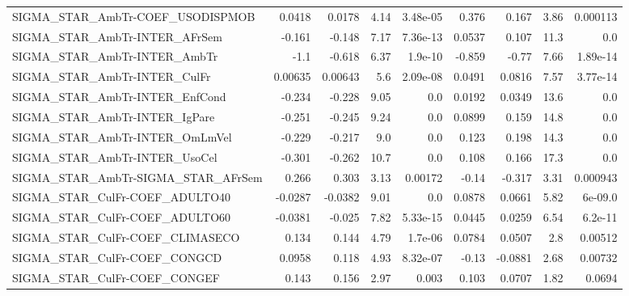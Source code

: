 \begin{tabular}{lrrrrrrrr}
SIGMA\_STAR\_AmbTr-COEF\_USODISPMOB      &      0.0418 &       0.0178 &     4.14 & 3.48e-05 &      0.376 &       0.167 &         3.86 &      0.000113 \\
SIGMA\_STAR\_AmbTr-INTER\_AFrSem         &      -0.161 &       -0.148 &     7.17 & 7.36e-13 &     0.0537 &       0.107 &         11.3 &           0.0 \\
SIGMA\_STAR\_AmbTr-INTER\_AmbTr          &        -1.1 &       -0.618 &     6.37 &  1.9e-10 &     -0.859 &       -0.77 &         7.66 &      1.89e-14 \\
SIGMA\_STAR\_AmbTr-INTER\_CulFr          &     0.00635 &      0.00643 &      5.6 & 2.09e-08 &     0.0491 &      0.0816 &         7.57 &      3.77e-14 \\
SIGMA\_STAR\_AmbTr-INTER\_EnfCond        &      -0.234 &       -0.228 &     9.05 &      0.0 &     0.0192 &      0.0349 &         13.6 &           0.0 \\
SIGMA\_STAR\_AmbTr-INTER\_IgPare         &      -0.251 &       -0.245 &     9.24 &      0.0 &     0.0899 &       0.159 &         14.8 &           0.0 \\
SIGMA\_STAR\_AmbTr-INTER\_OmLmVel        &      -0.229 &       -0.217 &      9.0 &      0.0 &      0.123 &       0.198 &         14.3 &           0.0 \\
SIGMA\_STAR\_AmbTr-INTER\_UsoCel         &      -0.301 &       -0.262 &     10.7 &      0.0 &      0.108 &       0.166 &         17.3 &           0.0 \\
SIGMA\_STAR\_AmbTr-SIGMA\_STAR\_AFrSem    &       0.266 &        0.303 &     3.13 &  0.00172 &      -0.14 &      -0.317 &         3.31 &      0.000943 \\
SIGMA\_STAR\_CulFr-COEF\_ADULTO40        &     -0.0287 &      -0.0382 &     9.01 &      0.0 &     0.0878 &      0.0661 &         5.82 &       6e-09.0 \\
SIGMA\_STAR\_CulFr-COEF\_ADULTO60        &     -0.0381 &       -0.025 &     7.82 & 5.33e-15 &     0.0445 &      0.0259 &         6.54 &       6.2e-11 \\
SIGMA\_STAR\_CulFr-COEF\_CLIMASECO       &       0.134 &        0.144 &     4.79 &  1.7e-06 &     0.0784 &      0.0507 &          2.8 &       0.00512 \\
SIGMA\_STAR\_CulFr-COEF\_CONGCD          &      0.0958 &        0.118 &     4.93 & 8.32e-07 &      -0.13 &     -0.0881 &         2.68 &       0.00732 \\
SIGMA\_STAR\_CulFr-COEF\_CONGEF          &       0.143 &        0.156 &     2.97 &    0.003 &      0.103 &      0.0707 &         1.82 &        0.0694 \\

\end{tabular}
